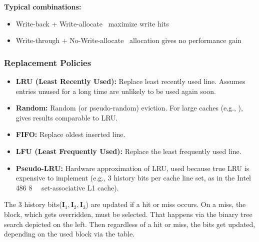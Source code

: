     \textbf{Typical combinations:}
    \begin{itemize}
      \item Write-back + Write-allocate \textrightarrow~maximize write \textcolor{codeGreen}{hits}
      \item Write-through + No-Write-allocate \textrightarrow~allocation gives no performance gain 
    \end{itemize}


  \subsubsection{Replacement Policies}
    \begin{itemize}
      \item \textbf{LRU (Least Recently Used):} Replace least recently used line.
        Assumes entries unused for a long time are unlikely to be used again soon.
      \item \textbf{Random:} Random (or pseudo-random) eviction.
        For large caches (e.g., ), gives results comparable to LRU.
      \item \textbf{FIFO:} Replace oldest inserted line.
      \item \textbf{LFU (Least Frequently Used):} Replace the least frequently used line.
      \item \textbf{Pseudo-LRU:} Hardware approximation of LRU, used because true LRU is expensive to implement (e.g., 3 history bits per cache line set, as in the Intel 486 \qty{8}{\kilo\byte}  set-associative L1 cache).
    \end{itemize}
    \vspace*{-0.2cm}
    \begin{minipage}{0.5\columnwidth}
      
    \end{minipage}
    \begin{minipage}{0.5\columnwidth}
      The 3 history bits($\mathbf{I}_1, \mathbf{I}_2,\mathbf{I}_3$) are updated if a hit or miss occurs.
      On a miss, the block, which gets overridden, must be selected.
      That happens via the binary tree search depicted on the left.
      Then regardless of a hit or miss, the bits get updated, depending on the used block via the table.
    \end{minipage}
    \vspace*{-0.6cm}
  
